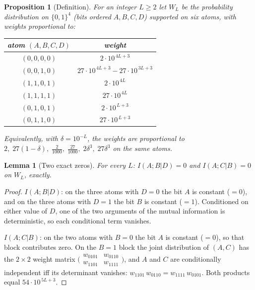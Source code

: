 \documentclass[11pt]{article}
\newtheorem{lemma}[theorem]{Lemma}
\newtheorem{proposition}[theorem]{Proposition}
\theoremstyle{remark}
\newcommand{\I}{\mathrel{;}}
\begin{document}
\begin{samepage}
\begin{proposition}[Definition]\label{def:family}
For an integer $L\ge 2$ let $W_L$ be the probability distribution on
$\{0,1\}^4$ (bits ordered $A,B,C,D$) supported on six atoms, with weights proportional
to:
\begin{center}
\begin{tabular}{cc}
\toprule
atom $(A,B,C,D)$ & weight \\
\midrule
$(0,0,0,0)$ & $2\cdot 10^{\,4L+3}$ \\
$(0,0,1,0)$ & $27\cdot 10^{\,4L+3}-27\cdot 10^{\,3L+3}$ \\
$(1,1,0,1)$ & $2\cdot 10^{\,4L}$ \\
$(1,1,1,1)$ & $27\cdot 10^{\,4L}$ \\
$(0,1,0,1)$ & $2\cdot 10^{\,L+3}$ \\
$(0,1,1,0)$ & $27\cdot 10^{\,L+3}$ \\
\bottomrule
\end{tabular}
\end{center}
Equivalently, with $\delta=10^{-L}$, the weights are proportional to
$2,\;27(1-\delta),\;\tfrac{2}{1000},\;\tfrac{27}{1000},\;2\delta^{3},\;27\delta^{3}$
on the same atoms.
\end{proposition}
\end{samepage}

\begin{lemma}[Two exact zeros]\label{lem:zeros}
For every $L$: $I(A\I B|D)=0$ and $I(A\I C|B)=0$ on $W_L$, exactly.
\end{lemma}

\begin{proof}
$I(A\I B|D)$: on the three atoms with $D=0$ the bit $A$ is constant ($=0$), and on the
three atoms with $D=1$ the bit $B$ is constant ($=1$). Conditioned on either value of
$D$, one of the two arguments of the mutual information is deterministic, so each
conditional term vanishes.

$I(A\I C|B)$: on the two atoms with $B=0$ the bit $A$ is constant ($=0$), so that block
contributes zero. On the $B=1$ block the joint distribution of $(A,C)$ has the $2\times2$
weight matrix
$\bigl(\begin{smallmatrix} w_{0101} & w_{0110}\\ w_{1101} & w_{1111}\end{smallmatrix}\bigr)$,
and $A$ and $C$ are conditionally independent iff its determinant vanishes:
$w_{1101}\,w_{0110} = w_{1111}\,w_{0101}$. Both products equal
$54\cdot 10^{\,5L+3}$.
\end{proof}
\end{document}
